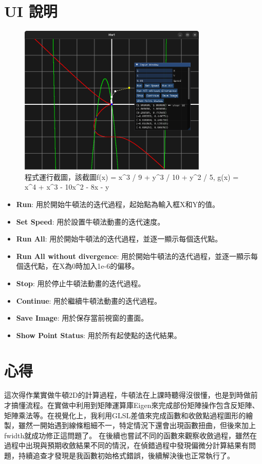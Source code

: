 \documentclass[a4paper,12pt]{article}
\begin{document}
\section{UI 說明}
\begin{figure}[h]
    \centering
    \includegraphics[width=0.8\textwidth]{img/image.png}
    \caption{程式運行截圖，該截圖f(x) = x^3 / 9 + y^3 / 10 + y^2 / 5, g(x) = x^4 + x^3 - 10x^2 - 8x - y }
\end{figure}

\begin{itemize}
    \item \textbf{Run}: 用於開始牛頓法的迭代過程，起始點為輸入框X和Y的值。
    \item \textbf{Set Speed}: 用於設置牛頓法動畫的迭代速度。
    \item \textbf{Run All}: 用於開始牛頓法的迭代過程，並逐一顯示每個迭代點。
    \item \textbf{Run All without divergence}: 用於開始牛頓法的迭代過程，並逐一顯示每個迭代點，在X為0時加入1e-6的偏移。
    \item \textbf{Stop}: 用於停止牛頓法動畫的迭代過程。
    \item \textbf{Continue}: 用於繼續牛頓法動畫的迭代過程。
    \item \textbf{Save Image}: 用於保存當前視窗的畫面。
    \item \textbf{Show Point Status}: 用於所有起使點的迭代結果。
\end{itemize}

\section{心得}
這次得作業實做牛頓2D的計算過程，牛頓法在上課時聽得沒很懂，也是到時做前才搞懂流程。在實做中利用到矩陣運算庫Eigen來完成部份矩陣操作包含反矩陣、矩陣乘法等。在視覺化上，我利用GLSL差值來完成函數和收斂點過程圖形的繪製，雖然一開始遇到線條粗細不一，特定情況下還會出現函數扭曲，但後來加上fwidth就成功修正這問題了。
在後續也嘗試不同的函數來觀察收斂過程，雖然在過程中出現與預期收斂結果不同的情況，在偵錯過程中發現偏微分計算結果有問題，持續追查才發現是我函數初始格式錯誤，後續解決後也正常執行了。
\end{document}
